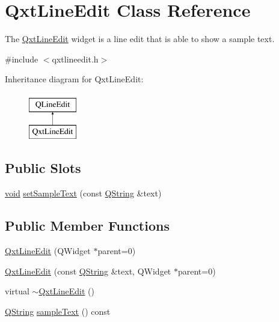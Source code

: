 \hypertarget{class_qxt_line_edit}{\section{Qxt\-Line\-Edit Class Reference}
\label{class_qxt_line_edit}
}


The \hyperlink{class_qxt_line_edit}{Qxt\-Line\-Edit} widget is a line edit that is able to show a sample text.  




{\ttfamily \#include $<$qxtlineedit.\-h$>$}

Inheritance diagram for Qxt\-Line\-Edit\-:\begin{figure}[H]
\begin{center}
\leavevmode
\includegraphics[height=2.000000cm]{class_qxt_line_edit}
\end{center}
\end{figure}
\subsection*{Public Slots}
\begin{DoxyCompactItemize}
\item 
\hyperlink{group___u_a_v_objects_plugin_ga444cf2ff3f0ecbe028adce838d373f5c}{void} \hyperlink{class_qxt_line_edit_a6d9769976c32b6ced0848f914f5704ee}{set\-Sample\-Text} (const \hyperlink{group___u_a_v_objects_plugin_gab9d252f49c333c94a72f97ce3105a32d}{Q\-String} \&text)
\end{DoxyCompactItemize}
\subsection*{Public Member Functions}
\begin{DoxyCompactItemize}
\item 
\hyperlink{class_qxt_line_edit_a4d17c23021efd65dd22cd6a33604f6bf}{Qxt\-Line\-Edit} (Q\-Widget $\ast$parent=0)
\item 
\hyperlink{class_qxt_line_edit_a5e1ed2e2604d8ecf86278c07cb8703dc}{Qxt\-Line\-Edit} (const \hyperlink{group___u_a_v_objects_plugin_gab9d252f49c333c94a72f97ce3105a32d}{Q\-String} \&text, Q\-Widget $\ast$parent=0)
\item 
virtual \hyperlink{class_qxt_line_edit_ad9400264472fdc3e1f89f88dadad1193}{$\sim$\-Qxt\-Line\-Edit} ()
\item 
\hyperlink{group___u_a_v_objects_plugin_gab9d252f49c333c94a72f97ce3105a32d}{Q\-String} \hyperlink{class_qxt_line_edit_a73748836e4207b125cbd0f66383d7e64}{sample\-Text} () const 
\end{DoxyCompactItemize}
